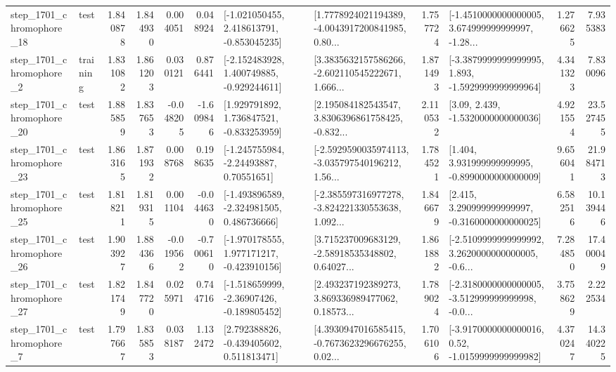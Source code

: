\begin{tabular}{llrrrrllrlrr}
 step\_1701\_chromophore\_18 &      test &      1.840878 &    1.844930 &      0.004051 &  0.048924 &   [-1.021050455, 2.418613791, -0.853045235] &  [1.7778924021194389, -4.0043917200841985, 0.80... &       1.757724 &  [-1.4510000000000005, 3.674999999999997, -1.28... &            1.276625 &          7.935383 \\
  step\_1701\_chromophore\_2 &  training &      1.831082 &    1.861203 &      0.030121 &  0.876441 &   [-2.152483928, 1.400749885, -0.929244611] &  [3.3835632157586266, -2.602110545222671, 1.666... &       1.871493 &  [-3.3879999999999995, 1.893, -1.5929999999999964] &            4.341323 &          7.830096 \\
 step\_1701\_chromophore\_20 &      test &      1.885859 &    1.837653 &     -0.048205 & -1.609846 &    [1.929791892, 1.736847521, -0.833253959] &  [2.195084182543547, 3.8306396861758425, -0.832... &       2.110532 &                 [3.09, 2.439, -1.5320000000000036] &            4.921554 &         23.527455 \\
 step\_1701\_chromophore\_23 &      test &      1.863165 &    1.871932 &      0.008768 &  0.198635 &     [-1.245755984, -2.24493887, 0.70551651] &  [-2.5929590035974113, -3.035797540196212, 1.56... &       1.784521 &    [1.404, 3.931999999999995, -0.8990000000000009] &            9.656041 &         21.984713 \\
 step\_1701\_chromophore\_25 &      test &      1.818211 &    1.819315 &      0.001104 & -0.044630 &   [-1.493896589, -2.324981505, 0.486736666] &  [-2.385597316977278, -3.824221330553638, 1.092... &       1.846679 &    [2.415, 3.290999999999997, -0.3160000000000025] &            6.582516 &         10.139446 \\
 step\_1701\_chromophore\_26 &      test &      1.903927 &    1.884366 &     -0.019562 & -0.700610 &   [-1.970178555, 1.977171217, -0.423910156] &  [3.715237009683129, -2.58918535348802, 0.64027... &       1.861882 &  [-2.5109999999999992, 3.2620000000000005, -0.6... &            7.284850 &         17.400049 \\
 step\_1701\_chromophore\_27 &      test &      1.821749 &    1.847720 &      0.025971 &  0.744716 &   [-1.518659999, -2.36907426, -0.189805452] &  [2.493237192389273, 3.869336989477062, 0.18573... &       1.789024 &  [-2.3180000000000005, -3.512999999999998, -0.0... &            3.758629 &          2.222534 \\
  step\_1701\_chromophore\_7 &      test &      1.797667 &    1.835853 &      0.038187 &  1.132472 &    [2.792388826, -0.439405602, 0.511813471] &  [4.3930947016585415, -0.7673623296676255, 0.02... &       1.706106 &   [-3.9170000000000016, 0.52, -1.0159999999999982] &            4.370247 &         14.340225 \\

\end{tabular}
